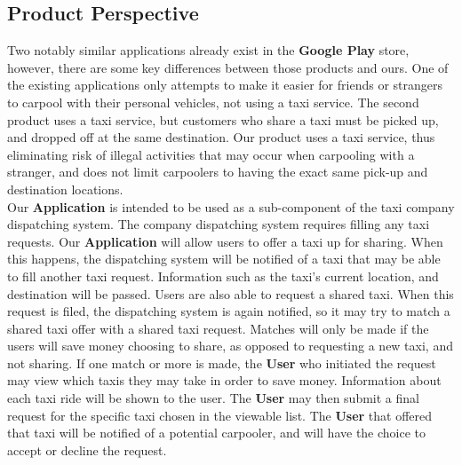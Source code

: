 \documentclass[english]{article}
\begin{document}
\subsection{Product Perspective}
\label{sub:product_perspective}
Two notably similar applications already exist in the \textbf{Google Play} store, however, there are some key differences between those products and ours. One of the existing applications only attempts to make it easier for friends or strangers to carpool with their personal vehicles, not using a taxi service. The second product uses a taxi service, but customers who share a taxi must be picked up, and dropped off at the same destination. Our product uses a taxi service, thus eliminating risk of illegal activities that may occur when carpooling with a stranger, and does not limit carpoolers to having the exact same pick-up and destination locations.
\\
\bigskip
Our \textbf{Application} is intended to be used as a sub-component of the taxi company dispatching system. The company dispatching system requires filling any taxi requests. Our \textbf{Application} will allow users to offer a taxi up for sharing. When this happens, the dispatching system will be notified of a taxi that may be able to fill another taxi request. Information such as the taxi's current location, and destination will be passed. Users are also able to request a shared taxi. When this request is filed, the dispatching system is again notified, so it may try to match a shared taxi offer with a shared taxi request. Matches will only be made if the users will save money choosing to share, as opposed to requesting a new taxi, and not sharing. If one match or more is made, the \textbf{User} who initiated the request may view which taxis they may take in order to save money. Information about each taxi ride will be shown to the user. The \textbf{User} may then submit a final request for the specific taxi chosen in the viewable list. The \textbf{User} that offered that taxi will be notified of a potential carpooler, and will have the choice to accept or decline the request.
\end{document}
